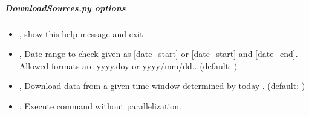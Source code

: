 \documentclass[letterpaper,10pt,english]{sphinxmanual}
\begin{document}
\subparagraph{DownloadSources.py options}
\label{\detokenize{pgamit.com:DownloadSources.py-options}}\begin{itemize}
\item {} 
\sphinxAtStartPar
{\hyperref[\detokenize{pgamit.com:DownloadSources.py--h}]{}}, {\hyperref[\detokenize{pgamit.com:DownloadSources.py---help}]{}} \sphinxhyphen{} show this help message and exit

\item {} 
\sphinxAtStartPar
{\hyperref[\detokenize{pgamit.com:DownloadSources.py--date}]{}} , {\hyperref[\detokenize{pgamit.com:DownloadSources.py---date_range}]{}}  \sphinxhyphen{} Date range to check given as {[}date\_start{]} or {[}date\_start{]} and {[}date\_end{]}. Allowed formats are yyyy.doy or yyyy/mm/dd.. (default: )

\item {} 
\sphinxAtStartPar
{\hyperref[\detokenize{pgamit.com:DownloadSources.py--win}]{}} , {\hyperref[\detokenize{pgamit.com:DownloadSources.py---window}]{}}  \sphinxhyphen{} Download data from a given time window determined by today \sphinxhyphen{} . (default: )

\item {} 
\sphinxAtStartPar
{\hyperref[\detokenize{pgamit.com:DownloadSources.py--np}]{}}, {\hyperref[\detokenize{pgamit.com:DownloadSources.py---noparallel}]{}} \sphinxhyphen{} Execute command without parallelization.

\end{itemize}
\end{document}
